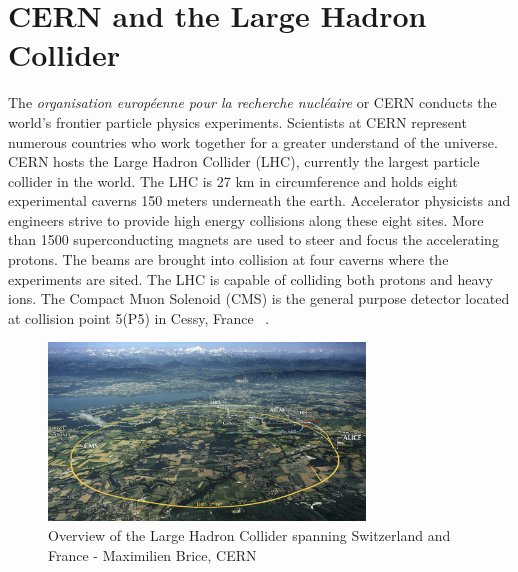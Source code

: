 \section{CERN and the Large Hadron Collider}
The \textit{organisation européenne pour la recherche nucléaire} or CERN conducts the world's frontier particle physics experiments. 
Scientists at CERN represent numerous countries who work together for a greater understand of the universe. 
CERN hosts the Large Hadron Collider (LHC), currently the largest particle collider in the world. The LHC is 27 km in circumference and holds eight experimental caverns 150 meters underneath the earth. Accelerator physicists and engineers strive to provide high energy collisions along these eight sites. More than 1500 superconducting magnets are used to steer and focus the accelerating protons. 
The beams are brought into collision at four caverns where the experiments are sited.
The LHC is capable of colliding both protons and heavy ions. 
The Compact Muon Solenoid (CMS) is the general purpose detector located at collision point 5(P5) in Cessy, France ~\cite{Bruning:782076}. 

\begin{figure}[ht!b]
  \centering
\includegraphics[width=0.75\textwidth]{figures/LHC_map-s.jpg}    
    \caption{\label{fig:lhc} Overview of the Large Hadron Collider spanning Switzerland and France - Maximilien Brice, CERN }
\end{figure}

